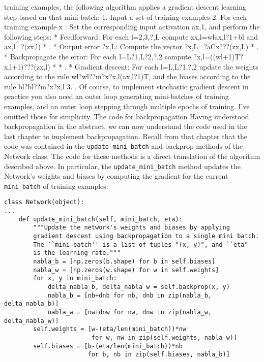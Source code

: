 training examples, the following algorithm applies a gradient descent learning step based on that mini-batch: 
1. Input a set of training examples
2. For each training example x
: Set the corresponding input activation ax,1, and perform the following steps:
* Feedforward: For each l=2,3,?,L
compute zx,l=wlax,l?1+bl and ax,l=?(zx,l)
*  .
*  Output error ?x,L: Compute the vector ?x,L=?aCx???(zx,L)
*  .
*  Backpropagate the error: For each l=L?1,L?2,?,2 compute ?x,l=((wl+1)T?x,l+1)???(zx,l)
* *  . 
*  Gradient descent: For each l=L,L?1,?,2 update the weights according to the rule wl?wl??m?x?x,l(ax,l?1)T, and the biases according to the rule bl?bl??m?x?x,l
3. .
Of course, to implement stochastic gradient descent in practice you also need an outer loop generating mini-batches of training examples, and an outer loop stepping through multiple epochs of training. I've omitted those for simplicity. 
The code for backpropagation
Having understood backpropagation in the abstract, we can now understand the code used in the last chapter to implement backpropagation. Recall from that chapter that the code was contained in the \lstinline{update_mini_batch} and backprop methods of the Network class. The code for these methods is a direct translation of the algorithm described above. In particular, the \lstinline{update_mini_batch} method updates the Network's weights and biases by computing the gradient for the current \lstinline{mini_batch} of training examples: 
\begin{lstlisting}
class Network(object):
...
    def update_mini_batch(self, mini_batch, eta):
        """Update the network's weights and biases by applying
        gradient descent using backpropagation to a single mini batch.
        The ``mini_batch'' is a list of tuples "(x, y)", and ``eta"
        is the learning rate."""
        nabla_b = [np.zeros(b.shape) for b in self.biases]
        nabla_w = [np.zeros(w.shape) for w in self.weights]
        for x, y in mini_batch:
            delta_nabla_b, delta_nabla_w = self.backprop(x, y)
            nabla_b = [nb+dnb for nb, dnb in zip(nabla_b, delta_nabla_b)]
            nabla_w = [nw+dnw for nw, dnw in zip(nabla_w, delta_nabla_w)]
        self.weights = [w-(eta/len(mini_batch))*nw 
                        for w, nw in zip(self.weights, nabla_w)]
        self.biases = [b-(eta/len(mini_batch))*nb 
                       for b, nb in zip(self.biases, nabla_b)]
\end{lstlisting}
